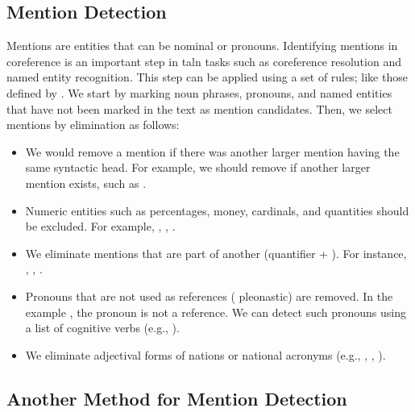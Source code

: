 \documentclass{KBook}
\begin{document}
\subsection{Mention Detection}

Mentions are entities that can be nominal  or pronouns.
Identifying mentions in coreference is an important step in \ac{taln} tasks such as coreference resolution and named entity recognition.
This step can be applied using a set of rules; like those defined by \citet{2013-lee-al}.
We start by marking noun phrases, pronouns, and named entities that have not been marked in the text as mention candidates.
Then, we select mentions by elimination as follows:

\begin{itemize}
	\item We would remove a mention if there was another larger mention having the same syntactic head. For example, we should remove  if another larger mention exists, such as .
	
	\item Numeric entities such as percentages, money, cardinals, and quantities should be excluded. For example, , , .
	
	\item We eliminate mentions that are part of another (quantifier + ). For instance, , , .
	
	\item Pronouns that are not used as references ( pleonastic) are removed. In the example , the pronoun  is not a reference. We can detect such pronouns using a list of cognitive verbs (e.g., ).
	
	\item We eliminate adjectival forms of nations or national acronyms (e.g., , , ).
\end{itemize}


\subsection{Another Method for Mention Detection}
\end{document}
